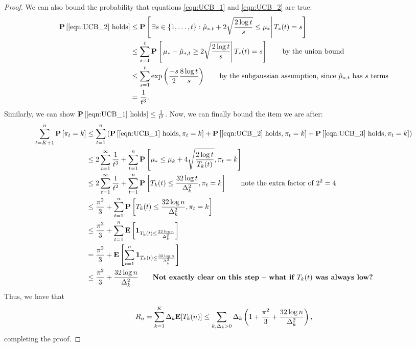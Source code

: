\begin{proof}
We can also bound the probability that equations \eqref{eqn:UCB_1} and \eqref{eqn:UCB_2} are true:
\begin{align*}
\mathbf{P} \left[\text{\eqref{eqn:UCB_2} holds} \right] & \leq \mathbf{P} \left[ \left. \exists s \in \{1, \ldots, t\}: \hat \mu_{*, t} + 2 \sqrt{\frac{2 \log t}{s}} \leq \mu_* \right| T_*(t) = s \right] \\
&\leq \sum_{s = 1}^t \mathbf{P} \left[ \left. \mu_* - \hat \mu_{*, t} \geq 2 \sqrt{\frac{2 \log t}{s}} \right| T_*(t) = s \right] \qquad \text{by the union bound}\\
&\leq \sum_{s=1}^t \exp \left(\frac{-s}{2} \frac{8 \log t}{s}\right) \qquad \text{by the subgaussian assumption, since $\hat \mu_{*, t}$ has $s$ terms} \\
&= \frac{1}{t^3}.
\end{align*}
Similarly, we can show $\mathbf{P} \left[ \text{\eqref{eqn:UCB_1} holds}\right] \leq \frac{1}{t^3}$.  
\allowdisplaybreaks
Now, we can finally bound the item we are after: 
\begin{align*}
\sum_{t=K+1}^n \mathbf{P} \left[\pi_t = k \right] & \leq \sum_{t=1}^n \left(\mathbf{P} \left[ \text{\eqref{eqn:UCB_1} holds}, \pi_t = k\right] + \mathbf{P}\left[ \text{\eqref{eqn:UCB_2} holds}, \pi_t = k\right] + \mathbf{P}\left[\text{\eqref{eqn:UCB_3} holds}, \pi_t = k\right] \right) \\
&\leq 2 \sum_{t=1}^\infty \frac{1}{t^3} + \sum_{t=1}^n \mathbf{P} \left[\mu_* \leq \mu_k + 4 \sqrt{\frac{2 \log t}{T_k(t)}}, \pi_t = k \right] \\
&\leq 2 \sum_{t=1}^\infty \frac{1}{t^2} + \sum_{t=1}^n \mathbf{P}\left[T_k(t) \leq \frac{32 \log t}{\Delta_k^2}, \pi_t = k \right]
\qquad \text{note the extra factor of $2^2 = 4$} \\
& \leq \frac{\pi^2}{3} + \sum_{t=1}^n \mathbf{P}\left[T_k(t) \leq \frac{32 \log n}{\Delta_k^2}, \pi_t = k \right] \\
& \leq \frac{\pi^2}{3} + \sum_{t=1}^n \mathbf{E} \left[\mathbf{1}_{T_k(t) \leq \frac{32 \log n}{\Delta^2_k}}\right] \\
&= \frac{\pi^2}{3} +  \mathbf{E} \left[\sum_{t=1}^n \mathbf{1}_{T_k(t) \leq \frac{32 \log n}{\Delta^2_k}}\right] \\
&\leq \frac{\pi^2}{3} + \frac{32 \log n}{\Delta_k^2} \qquad \text{\textbf{Not exactly clear on this step -- what if $T_k(t)$ was always low?}}
\end{align*}
\allowdisplaybreaks[0]
Thus, we have that 
\[
R_n = \sum_{k=1}^K \Delta_k \mathbf{E} [T_k(n)] \leq \sum_{k, \Delta_k > 0} \Delta_k \left(1 + \frac{\pi^2}{3} + \frac{32 \log n}{\Delta_k^2} \right),
\]
completing the proof. 
\end{proof}

